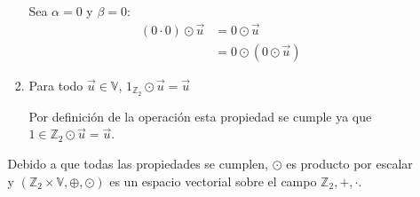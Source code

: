 \documentclass{report}
\begin{document}
\begin{enumerate}
\begin{enumerate}
\begin{enumerate}
                    Sea $\alpha = 0$ y $\beta = 0$:
                    \begin{align*}
                        (0 \cdot 0) \odot \vec{u} &= 0 \odot \vec{u} \\
                        &= 0 \odot (0 \odot \vec{u})
                    \end{align*}

                    \item Para todo $\vec{u} \in \mathbb{V}$, $1_{\mathbb{Z}_2} \odot \vec{u} = \vec{u}$

                    Por definición de la operación esta propiedad se cumple ya que $1 \in \mathbb{Z}_2 \odot \vec{u} = \vec{u}$.
                \end{enumerate}

                Debido a que todas las propiedades se cumplen, $\odot$ es producto por escalar y $(\mathbb{Z}_2 \times \mathbb{V}, \oplus, \odot)$ es un espacio vectorial sobre el campo $\mathbb{Z}_2, +, \cdot$.
            \end{enumerate}
    \end{enumerate}
\end{document}
